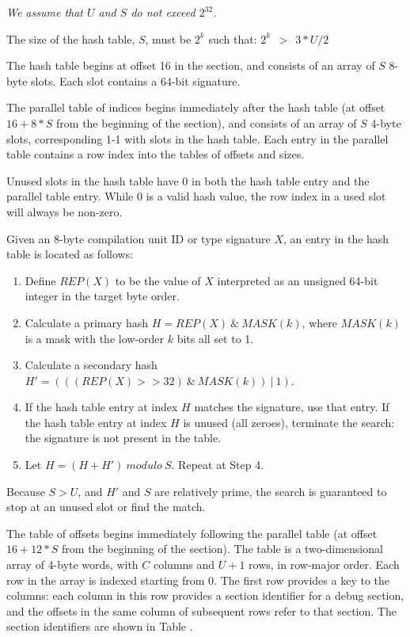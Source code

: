\textit{We assume that $U$ and $S$ do not exceed $2^{32}$.}

The size of the hash table, $S$, must be $2^k$ such that:
\hspace{0.3cm}$2^k\ \ >\ \ 3*U/2$

The hash table begins at offset 16 in the section, and consists
of an array of $S$ 8-byte slots. Each slot contains a 64-bit
signature.

The parallel table of indices begins immediately after the hash table 
(at offset \mbox{$16 + 8 * S$} from the beginning of the section), and
consists of an array of $S$ 4-byte slots,
corresponding 1-1 with slots in the hash
table. Each entry in the parallel table contains a row index into
the tables of offsets and sizes.

Unused slots in the hash table have 0 in both the hash table
entry and the parallel table entry. While 0 is a valid hash
value, the row index in a used slot will always be non-zero.

Given an 8-byte compilation unit ID or type signature $X$,
an entry in the hash table is located as follows:
\begin{enumerate}[1. ]
\item Define $REP(X)$ to be the value of $X$ interpreted as an 
      unsigned 64-bit integer in the target byte order.
\item Calculate a primary hash $H = REP(X)\ \&\ MASK(k)$, where
      $MASK(k)$ is a mask with the low-order $k$ bits all set to 1.
\item Calculate a secondary hash $H' = (((REP(X)>>32)\ \&\ MASK(k))\ |\ 1)$.
\item If the hash table entry at index $H$ matches the signature, use
      that entry. If the hash table entry at index $H$ is unused (all
      zeroes), terminate the search: the signature is not present
      in the table.
\item Let $H = (H + H')\ modulo\ S$. Repeat at Step 4.
\end{enumerate}

Because $S > U$, and $H'$ and $S$ are relatively prime, the search is
guaranteed to stop at an unused slot or find the match.

The table of offsets begins immediately following the parallel
table (at offset \mbox{$16 + 12 * S$} from the beginning of the section).
The table is a two-dimensional array of 4-byte words, 
with $C$ columns and $U + 1$
rows, in row-major order. Each row in the array is indexed
starting from 0. The first row provides a key to the columns:
each column in this row provides a section identifier for a debug
section, and the offsets in the same column of subsequent rows
refer to that section. The section identifiers are shown in
Table .

